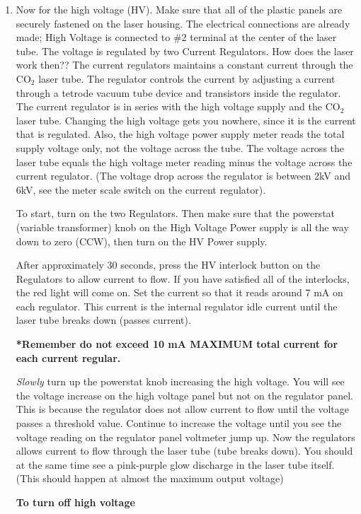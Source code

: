\documentclass{../lab}
\begin{document}
\begin{enumerate}
    \item Now for the high voltage (HV). Make sure that all of the plastic panels are securely fastened on the laser housing. The electrical connections are already made; High Voltage is connected to \#2 terminal at the center of the laser tube. The voltage is regulated by two Current Regulators. How does the laser work then?? The current regulators maintains a constant current through the CO$_2$ laser tube. The regulator controls the current by adjusting a current through a tetrode vacuum tube device and transistors inside the regulator. The current regulator is in series with the high voltage supply and the CO$_2$ laser tube. Changing the high voltage gets you nowhere, since it is the current that is regulated. Also, the high voltage power supply meter reads the total supply voltage only, not the voltage across the tube. The voltage across the laser tube equals the high voltage meter reading minus the voltage across the current regulator. (The voltage drop across the regulator is between 2kV and 6kV, see the meter scale switch on the current regulator).
    
    To start, turn on the two Regulators. Then make sure that the powerstat (variable transformer) knob on the High Voltage Power supply is all the way down to zero (CCW), then turn on the HV Power supply.
    
    After approximately 30 seconds, press the HV interlock button on the Regulators to allow current to flow. If you have satisfied all of the interlocks, the red light will come on. Set the current so that it reads around 7 mA on each regulator. This current is the internal regulator idle current until the laser tube breaks down (passes current).
    
    \textbf{*Remember do not exceed 10 mA MAXIMUM total current for each current regular.}
    
    \emph{Slowly} turn up the powerstat knob increasing the high voltage. You will see the voltage increase on the high voltage panel but not on the regulator panel. This is because the regulator does not allow current to flow until the voltage passes a threshold value. Continue to increase the voltage until you see the voltage reading on the regulator panel voltmeter jump up. Now the regulators allows current to flow through the laser tube (tube breaks down). You should at the same time see a pink-purple glow discharge in the laser tube itself. (This should happen at almost the maximum output voltage)

    \textbf{To turn off high voltage}


\end{enumerate}
\end{document}
